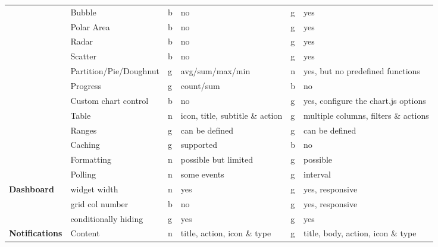 \begin{table}[]
\begin{tabular}{llllll}
        & Bubble                 & b  & no                              & g  & yes                                      \\
        & Polar Area             & b  & no                              & g  & yes                                      \\
        & Radar                  & b  & no                              & g  & yes                                      \\
        & Scatter                & b  & no                              & g  & yes                                      \\
        & Partition/Pie/Doughnut & g  & avg/sum/max/min                 & n  & yes, but no predefined functions         \\
        & Progress               & g  & count/sum                       & b  & no                                       \\
        & Custom chart control   & b  & no                              & g  & yes, configure the chart.js options      \\
        & Table                  & n  & icon, title, subtitle \& action & g  & multiple columns, filters \& actions     \\
        & Ranges                 & g  & can be defined                  & g  & can be defined                           \\
        & Caching                & g  & supported                       & b  & no                                       \\
        & Formatting             & n  & possible but limited            & g  & possible                                 \\
        & Polling                & n  & some events                     & g  & interval                                 \\
        \multirow{3}{*}{\textbf{Dashboard}}      & widget width           & n  & yes                             & g  & yes, responsive                          \\
        & grid col number        & b  & no                              & g  & yes, responsive                          \\
        & conditionally hiding   & g  & yes                             & g  & yes                                      \\
        \multirow{5}{*}{\textbf{Notifications}}  & Content                & n  & title, action, icon \& type     & g  & title, body, action, icon \& type        \\

\end{tabular}
\end{table}

